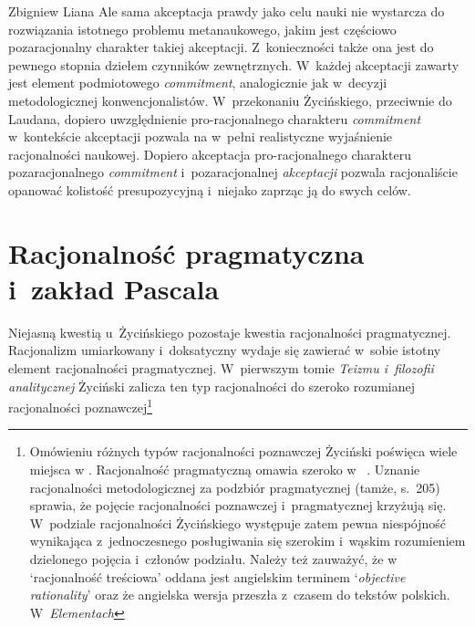 \begin{artplenv}{Zbigniew Liana}
Ale sama akceptacja prawdy jako celu nauki nie wystarcza do rozwiązania istotnego problemu metanaukowego, jakim jest częściowo pozaracjonalny charakter takiej akceptacji. Z~konieczności także ona jest do pewnego stopnia dziełem czynników zewnętrznych. W~każdej akceptacji zawarty jest element podmiotowego \textit{commitment}, analogicznie jak w~decyzji metodologicznej konwencjonalistów. W~przekonaniu Życińskiego, przeciwnie do Laudana, dopiero uwzględnienie pro-racjonalnego charakteru \textit{commitment} w~kontekście akceptacji pozwala na w~pełni realistyczne wyjaśnienie racjonalności naukowej. Dopiero akceptacja pro-racjonalnego charakteru pozaracjonalnego \textit{commitment} i~pozaracjonalnej \textit{akceptacji} pozwala racjonaliście opanować kolistość presupozycyjną i~niejako zaprząc ją do swych celów.

\section{Racjonalność pragmatyczna i~zakład Pascala}
Niejasną kwestią u~Życińskiego pozostaje kwestia racjonalności pragmatycznej. Racjonalizm umiarkowany i~doksatyczny wydaje się zawierać w~sobie istotny element racjonalności pragmatycznej. W~pierwszym tomie \textit{Teizmu i~filozofii analitycznej}
\parencite*[][]{zycinski_teizm_1985} %
 Życiński zalicza ten typ racjonalności do szeroko rozumianej racjonalności poznawczej\footnote{Omówieniu różnych typów racjonalności poznawczej Życiński poświęca wiele miejsca w
\parencites[][s.~195–216]{zycinski_teizm_1985}[][s.~128–135]{zycinski_structure_1988}[][s.~276–239]{zycinski_struktura_2013_liana}[zob. także][s.~14.235–240]{zycinski_granice_1993}. %
 Racjonalność pragmatyczną omawia szeroko w~
\parencite[][s.~205n.207–216]{zycinski_teizm_1985}. %
 Uznanie racjonalności metodologicznej za podzbiór pragmatycznej (tamże, s.~205) sprawia, że pojęcie racjonalności poznawczej i~pragmatycznej krzyżują się. W~podziale racjonalności Życińskiego występuje zatem pewna niespójność wynikająca z~jednoczesnego posługiwania się szerokim i~wąskim rozumieniem dzielonego pojęcia i~członów podziału. Należy też zauważyć, że w~
\parencites[][s.~132]{zycinski_structure_1988}[por.][s.~234]{zycinski_struktura_2013_liana} %
 ‘racjonalność treściowa' oddana jest angielskim terminem ‘\textit{objective rationality}' oraz że angielska wersja przeszła z~czasem do tekstów polskich. W~\textit{Elementach} 
}
\end{artplenv}
